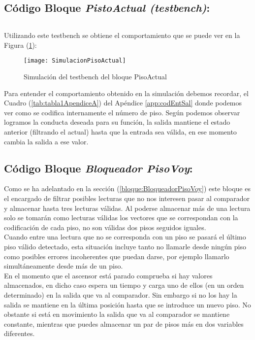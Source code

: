 \subsection{Código Bloque \textit{PistoActual (testbench)}:} \label{code:PisoActual_tb}
    \inputminted[frame=lines,fontsize=\footnotesize,linenos]{vhdl}{CodeFiles/PisoActual_tb.vhd}
    
    Utilizando este testbench se obtiene el comportamiento que se puede ver en la Figura (\ref{fig:SimulacionPisoActual}):

    \begin{figure}[H]
		    \centering
		    \texttt{[image: SimulacionPisoActual]}
		    \caption{Simulación del testbench del bloque PisoActual}
		    \label{fig:SimulacionPisoActual}
	\end{figure}

	Para entender el comportamiento obtenido en la simulación debemos recordar, el Cuadro (\ref{tab:tabla1ApendiceA}) del Apéndice \ref{app:codEntSal} donde podemos ver como se codifica internamente el número de piso. Según podemos observar logramos la conducta deseada para su función, la salida mantiene el estado anterior (filtrando el actual) hasta que la entrada sea válida, en ese momento cambia la salida a ese valor.

\subsection{Código Bloque \textit{Bloqueador PisoVoy}:} \label{code:BloqueadorpisoVoy}

    Como se ha adelantado en la sección (\ref{bloque:BloqueadorPisoVoy}) este bloque es el encargado de filtrar posibles lecturas que no nos interesen pasar al comparador y almacenar hasta tres lecturas válidas. Al poderse almacenar más de una lectura solo se tomarán como lecturas válidas los vectores que se correspondan con la codificación de cada piso, no son válidas dos pisos seguidos iguales. \\
    
    Cuando entre una lectura que no se corresponda con un piso se pasará el último piso válido detectado,  esta situación incluye tanto no llamarle desde ningún piso como posibles errores incoherentes que puedan darse, por ejemplo llamarlo simultáneamente desde más de un piso. \\
    
	En el momento que el ascensor está parado comprueba si hay valores almacenados, en dicho caso espera un tiempo y carga uno de ellos (en un orden determinado) en la salida que va al comparador. Sin embargo si no los hay la salida se mantiene en la última posición hasta que se introduce un nuevo piso. No obstante si está en movimiento la salida que va al comparador se mantiene constante, mientras que puedes almacenar un par de pisos más en dos variables diferentes.
	

